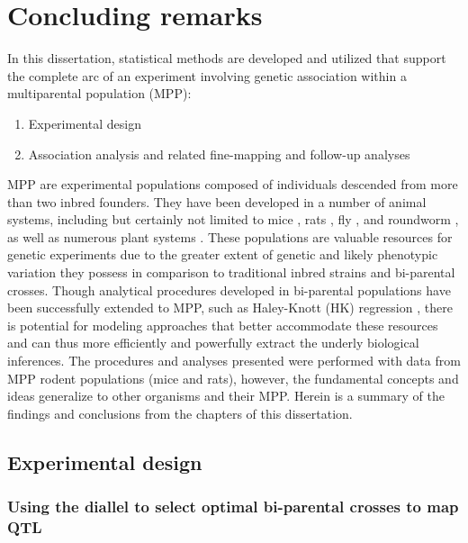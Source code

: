 \chapter{Concluding remarks}\label{chap:discussion}

In this dissertation, statistical methods are developed and utilized that support the complete arc of an experiment involving genetic association within a multiparental population (MPP):
\begin{enumerate}
	\item Experimental design
	\item Association analysis and related fine-mapping and follow-up analyses
\end{enumerate}

MPP are experimental populations composed of individuals descended from more than two inbred founders. They have been developed in a number of animal systems, including but certainly not limited to mice \citep{Churchill2004,Churchill2012}, rats \citep{Hansen1984}, fly \citep{King2012a, Long2014, King2017, Najarro2017, Stanley2017}, and roundworm \citep{Noble2017}, as well as numerous plant systems \citep{Kover2009, Bandillo2013,Buckler2009,Bouchet2017,Mangandi2017,Tisne2017}. These populations are valuable resources for genetic experiments due to the greater extent of genetic and likely phenotypic variation they possess in comparison to traditional inbred strains and bi-parental crosses. Though analytical procedures developed in bi-parental populations have been successfully extended to MPP, such as Haley-Knott (HK) regression \citep{Haley1992,Martinez1992}, there is potential for modeling approaches that better accommodate these resources and can thus more efficiently and powerfully extract the underly biological inferences. The procedures and analyses presented were performed with data from MPP rodent populations (mice and rats), however, the fundamental concepts and ideas generalize to other organisms and their MPP. Herein is a summary of the findings and conclusions from the chapters of this dissertation.

\section{Experimental design}

\subsection{Using the diallel to select optimal bi-parental crosses to map QTL}

